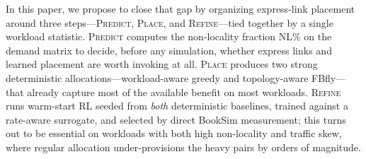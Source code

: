 \documentclass[conference]{IEEEtran}
\begin{document}
In this paper, we propose to close that gap by organizing express-link placement around three steps---\textsc{Predict}, \textsc{Place}, and \textsc{Refine}---tied together by a single workload statistic. \textsc{Predict} computes the non-locality fraction NL\% on the demand matrix to decide, before any simulation, whether express links and learned placement are worth invoking at all. \textsc{Place} produces two strong deterministic allocations---workload-aware greedy and topology-aware FBfly---that already capture most of the available benefit on most workloads. \textsc{Refine} runs warm-start RL seeded from \textit{both} deterministic baselines, trained against a rate-aware surrogate, and selected by direct BookSim measurement; this turns out to be essential on workloads with both high non-locality and traffic skew, where regular allocation under-provisions the heavy pairs by orders of magnitude.
\end{document}
